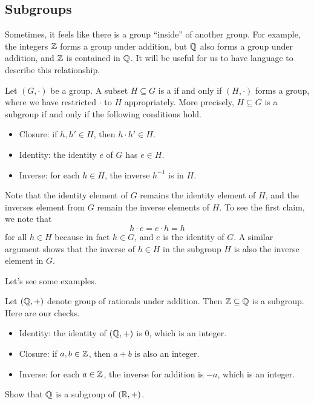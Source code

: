 \documentclass[../notes.tex]{subfiles}
\begin{document}
\subsection{Subgroups}
Sometimes, it feels like there is a group ``inside'' of another group. For example, the integers $\mathbb Z$ forms a group under addition, but $\mathbb Q$ also forms a group under addition, and $\mathbb Z$ is contained in $\mathbb Q$. It will be useful for us to have language to describe this relationship.
\begin{definition}[subgroup]
    Let $(G,\cdot)$ be a group. A subset $H\subseteq G$ is a  if and only if $(H,\cdot)$ forms a group, where we have restricted $\cdot$ to $H$ appropriately. More precisely, $H\subseteq G$ is a subgroup if and only if the following conditions hold.
    \begin{itemize}
        \item Closure: if $h,h'\in H$, then $h\cdot h'\in H$.
        \item Identity: the identity $e$ of $G$ has $e\in H$.
        \item Inverse: for each $h\in H$, the inverse $h^{-1}$ is in $H$.
    \end{itemize}
\end{definition}
\begin{remark}
    Note that the identity element of $G$ remains the identity element of $H$, and the inverses element from $G$ remain the inverse elements of $H$. To see the first claim, we note that
    \[h\cdot e=e\cdot h=h\]
    for all $h\in H$ because in fact $h\in G$, and $e$ is the identity of $G$. A similar argument shows that the inverse of $h\in H$ in the subgroup $H$ is also the inverse element in $G$.
\end{remark}
Let's see some examples.
\begin{example}
    Let $(\mathbb Q,+)$ denote group of rationals under addition. Then $\mathbb Z\subseteq\mathbb Q$ is a subgroup. Here are our checks.
    \begin{itemize}
        \item Identity: the identity of $(\mathbb Q,+)$ is $0$, which is an integer.
        \item Closure: if $a,b\in\mathbb Z$, then $a+b$ is also an integer.
        \item Inverse: for each $a\in\mathbb Z$, the inverse for addition is $-a$, which is an integer.
    \end{itemize}
\end{example}
\begin{exe}
    Show that $\mathbb Q$ is a subgroup of $(\mathbb R,+)$.
\end{exe}
\end{document}

